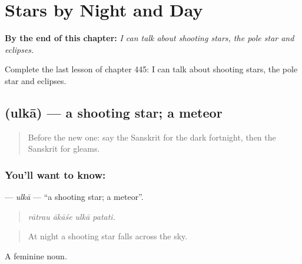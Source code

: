 
\chapter{Stars by Night and Day}
\label{ch:sa-stars-by-night-and-day}

\begin{chapteropening}
\textbf{By the end of this chapter:} \emph{I can talk about shooting stars, the pole star and eclipses.}

Complete the last lesson of chapter 445: I can talk about shooting stars, the pole star and eclipses.
\end{chapteropening}

\section[\texorpdfstring{\sk{उल्का} (ulkā)}{उल्का (ulkā)}]{ (ulkā) — a shooting star; a meteor}

\label{lesson:SA-C445-ulka}



\begin{quote}
Before the new one: say the Sanskrit for the dark fortnight, then the Sanskrit for gleams.
\end{quote}

\subsection*{You'll want to know: }
\textbf{} — \emph{ulkā} — \textquotedblleft{}a shooting star; a meteor\textquotedblright{}.

\begin{quote}
   
\end{quote}

\begin{quote}
\emph{rātrau ākāśe ulkā patati.}
\end{quote}

\begin{quote}
At night a shooting star falls across the sky.
\end{quote}

A feminine noun.

